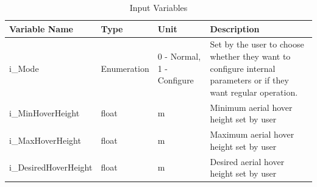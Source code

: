 \documentclass{article}
\begin{document}
\begin{table}[!h]
\begin{center}
\caption {Input Variables} \label{tab:title}
\label{InputVariables}
\begin{tabular}{ | m{3cm} | m{2cm} | m{2cm} | m{6cm} | } 
\hline
 Variable Name & Type & Unit & Description \\ 
 \hline
i\_Mode & Enumeration & 	0 - Normal, 1 - Configure &	Set by the user to choose whether they want to configure internal parameters or if they want regular operation. \\
\hline i\_MinHoverHeight & float	&m	& Minimum aerial hover height set by user\\
\hline i\_MaxHoverHeight & float	&m	& Maximum aerial hover height set by user\\
\hline i\_DesiredHoverHeight & float	&m	& Desired aerial hover height set by user\\
\hline 
\end{tabular}
\end{center}
\end{table}
\end{document}
